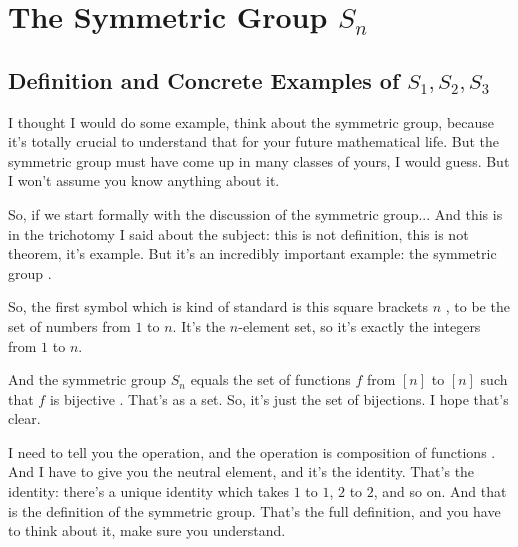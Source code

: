 \section{The Symmetric Group \texorpdfstring{$S_n$}{S\_n}}

\subsection{Definition and Concrete Examples of \texorpdfstring{$S_1, S_2, S_3$}{S\_1, S\_2, S\_3}}

\begin{speech}[01:01:49 - 01:03:59]
I thought I would do some example, think about the symmetric group, because it's totally crucial to understand that for your future mathematical life. But the symmetric group must have come up in many classes of yours, I would guess. But I won't assume you know anything about it.


So, if we start formally with the discussion of the symmetric group... And this is in the trichotomy I said about the subject: this is not definition, this is not theorem, it's example. But it's an incredibly important example: the symmetric group .

So, the first symbol which is kind of standard is this square brackets $n$ , to be the set of numbers from $1$ to $n$. It's the $n$-element set, so it's exactly the integers from $1$ to $n$.

And the symmetric group $S_n$ equals the set of functions $f$ from $[n]$ to $[n]$ such that $f$ is bijective . That's as a set. So, it's just the set of bijections. I hope that's clear.

I need to tell you the operation, and the operation is composition of functions . And I have to give you the neutral element, and it's the identity. That's the identity: there's a unique identity which takes $1$ to $1$, $2$ to $2$, and so on. And that is the definition of the symmetric group. That's the full definition, and you have to think about it, make sure you understand.
\end{speech}

